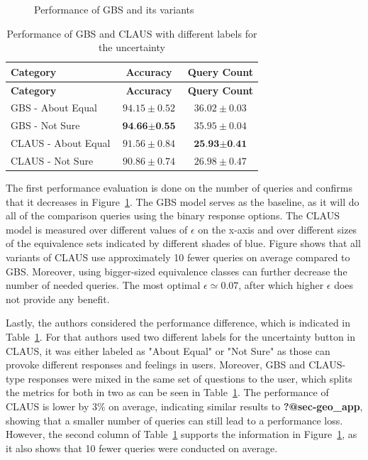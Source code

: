 \documentclass[
  letterpaper,
  numbers=noenddot,
  DIV=11]{scrreprt}
\theoremstyle{plain}
\theoremstyle{definition}
\theoremstyle{plain}
\theoremstyle{remark}
\begin{document}
\begin{figure}


\caption{\label{fig-claus_num}Performance of GBS and its variants}

\end{figure}%

\begin{longtable}[]{@{}lcc@{}}
\caption{Performance of GBS and CLAUS with different labels for the
uncertainty}\label{tbl-claus_tab}\tabularnewline
\toprule\noalign{}
\textbf{Category} & \textbf{Accuracy} & \textbf{Query Count} \\
\midrule\noalign{}
\endfirsthead
\toprule\noalign{}
\textbf{Category} & \textbf{Accuracy} & \textbf{Query Count} \\
\midrule\noalign{}
\endhead
\bottomrule\noalign{}
\endlastfoot
GBS - About Equal & \(94.15 \pm 0.52\) & \(36.02 \pm 0.03\) \\
GBS - Not Sure & \(\textbf{94.66} \pm \textbf{0.55}\) &
\(35.95 \pm 0.04\) \\
CLAUS - About Equal & \(91.56 \pm 0.84\) &
\(\textbf{25.93} \pm \textbf{0.41}\) \\
CLAUS - Not Sure & \(90.86 \pm 0.74\) & \(26.98 \pm 0.47\) \\
\end{longtable}

The first performance evaluation is done on the number of queries and
confirms that it decreases in Figure~\ref{fig-claus_num}. The GBS model
serves as the baseline, as it will do all of the comparison queries
using the binary response options. The CLAUS model is measured over
different values of \(\epsilon\) on the x-axis and over different sizes
of the equivalence sets indicated by different shades of blue. Figure
shows that all variants of CLAUS use approximately 10 fewer queries on
average compared to GBS. Moreover, using bigger-sized equivalence
classes can further decrease the number of needed queries. The most
optimal \(\epsilon \simeq 0.07\), after which higher \(\epsilon\) does
not provide any benefit.

Lastly, the authors considered the performance difference, which is
indicated in Table~\ref{tbl-claus_tab}. For that authors used two
different labels for the uncertainty button in CLAUS, it was either
labeled as "About Equal" or "Not Sure" as those can provoke different
responses and feelings in users. Moreover, GBS and CLAUS-type responses
were mixed in the same set of questions to the user, which splits the
metrics for both in two as can be seen in Table~\ref{tbl-claus_tab}. The
performance of CLAUS is lower by \(3\%\) on average, indicating similar
results to \textbf{?@sec-geo\_app}, showing that a smaller number of
queries can still lead to a performance loss. However, the second column
of Table~\ref{tbl-claus_tab} supports the information in
Figure~\ref{fig-claus_num}, as it also shows that 10 fewer queries were
conducted on average.
\end{document}
